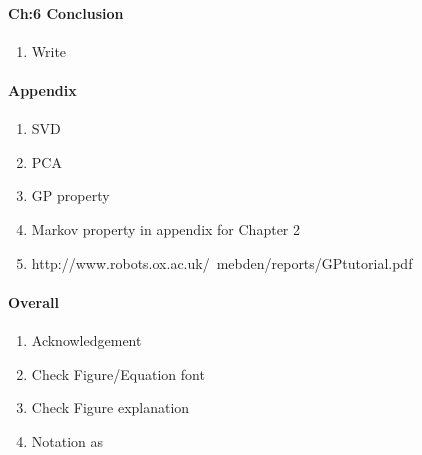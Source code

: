 \documentclass[a4paper,10pt]{article}
\begin{document}
\paragraph{Ch:6 Conclusion}
\begin{enumerate}
 \item Write
\end{enumerate}

\paragraph{Appendix}
\begin{enumerate}
 \item SVD
 \item PCA
 \item GP property
 \item Markov property in appendix for Chapter 2
 \item http://www.robots.ox.ac.uk/~mebden/reports/GPtutorial.pdf
\end{enumerate}

\paragraph{Overall}
\begin{enumerate}
 \item Acknowledgement 
 \item Check Figure/Equation font
 \item Check Figure explanation
 \item Notation as %
 
\end{enumerate}
\end{document}
